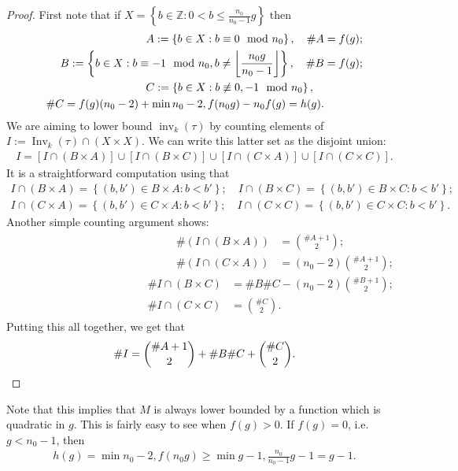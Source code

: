 \documentclass[11pt]{article}
\theoremstyle{definition}
\numberwithin{equation}{section}
\newcommand{\Z}{\mathbb{Z}}
\newcommand{\Inv}{\operatorname{Inv}}
\newcommand{\inv}{\operatorname{inv}}
\newcommand{\set}[1]{\left\{{#1}\right\}}
\DeclarePairedDelimiter\floor{\lfloor}{\rfloor}
\begin{document}
\begin{proof}
    First note that if $X = \set{b \in \Z: 0<b\leq \frac{n_0}{n_0-1}g}$ then
    \begin{align*}
        A:= \set{b \in X:b \equiv 0 \mod n_0}, \quad \#A &= f(g);\\
        B:= \set{b \in X: b \equiv -1 \mod n_0, b \neq \floor*{\frac{n_0g}{n_0-1}}}, \quad \#B &= f(g);\\
        C:= \set{b \in X:b\not \equiv 0,-1 \mod n_0}, \quad \\\#C = f(g)(n_0-2) + \min{n_0-2,f(n_0g) -n_0 f(g)} = h(g).
    \end{align*}
    We are aiming to lower bound $\inv_k(\tau)$ by counting elements of $I:=\Inv_k(\tau) \cap (X \times X)$. We can write this latter set as the disjoint union:
    \begin{align*}
        I = [I\cap (B\times A)] \cup [I \cap (B\times C)]\cup [I\cap (C\times A)] \cup [I \cap (C\times C)].
    \end{align*}
    It is a straightforward computation using  that
    \begin{align*}
        I \cap (B\times A) = \set{(b,b') \in B\times A:b<b'}; \quad I \cap (B\times C) = \set{(b,b') \in B\times C:b<b'};\\
        I \cap (C\times A) = \set{(b,b') \in C\times A:b<b'}; \quad 
        I \cap (C\times C) = \set{(b,b') \in C\times C:b<b'}.
    \end{align*}
    Another simple counting argument shows:
    \begin{align*}
    \begin{split}
        \#(I \cap (B\times A)) &= \binom{\#A{+}1}{2};\\
        \#(I \cap (C\times A)) &= (n_0{-}2)\binom{\#A{+}1}{2};
    \end{split}
    \begin{split}
        \#I \cap (B \times C) &= \#B\#C - (n_0{-}2)\binom{\#B{+}1}{2};\\
        \#I \cap (C\times C) &=\binom{\#C}{2}.
    \end{split}
    \end{align*}
    Putting this all together, we get that
\[
        \#I = \binom{\#A+1}{2} + \#B\#C + \binom{\#C}{2}. \qedhere
\]
\end{proof}

Note that this implies that $M$ is always lower bounded by a function which is quadratic in $g$. This is fairly easy to see when $f(g) >0$. If $f(g) = 0$, i.e. $g<n_0 -1$, then
\begin{align*}
    h(g) = \min{n_0-2,f(n_0g)} \geq \min{g-1,\frac{n_0}{n_0-1}g-1} = g-1.
\end{align*}
\end{document}
